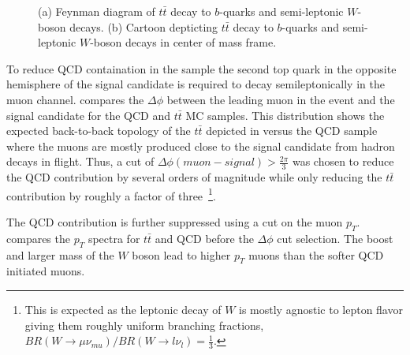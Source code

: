 \begin{figure}[!htbp]
{{
}} \hfill
{}

\caption{(a) Feynman diagram of $t\bar{t}$ decay to $b$-quarks and semi-leptonic $W$-boson decays. (b) Cartoon depticting $t\bar{t}$ decay to $b$-quarks and semi-leptonic $W$-boson decays in center of mass frame.}
\label{sec:background:ttbar_depiction}

\end{figure}

To reduce QCD containation in the sample the second top quark in the opposite
hemisphere of the signal candidate is required to decay semileptonically in the
muon channel.  compares the $\Delta\phi$
between the leading muon in the event and the signal candidate for the QCD and
$t\bar{t}$ MC samples. This distribution shows the expected back-to-back
topology of the $t\bar{t}$ depicted in 
versus the QCD sample where the muons are mostly produced close to the signal
candidate from hadron decays in flight. Thus, a cut of $\Delta\phi(muon-signal)
> \frac{2\pi}{3}$ was chosen to reduce the QCD contribution by several orders
of magnitude while only reducing the $t\bar{t}$ contribution by roughly a
factor of three~\footnote{This is expected as the leptonic decay of $W$ is mostly
agnostic to lepton flavor giving them roughly uniform branching fractions,
$BR(W \rightarrow \mu \nu_{mu}) / BR(W \rightarrow l \nu_l) = \frac{1}{3}$.}.

The QCD contribution is further suppressed using a cut on the muon $p_{T}$.
 compares the $p_{T}$ spectra for $t\bar{t}$ and
QCD before the $\Delta\phi$ cut selection. The boost and larger mass of the $W$
boson lead to higher $p_{T}$ muons than the softer QCD initiated muons.

